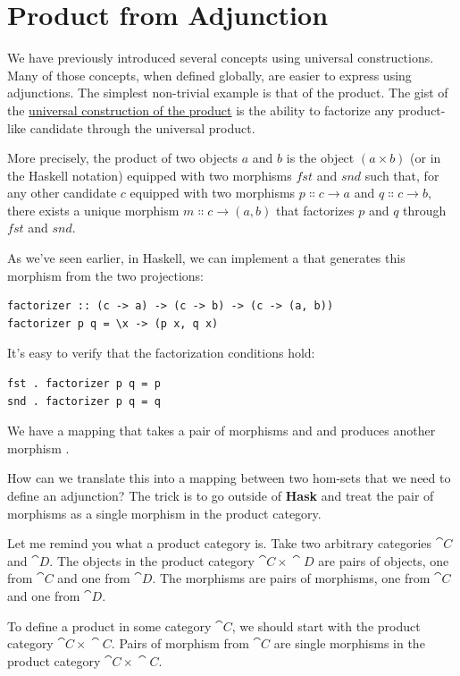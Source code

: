 \section{Product from Adjunction}

We have previously introduced several concepts using universal
constructions. Many of those concepts, when defined globally, are easier
to express using adjunctions. The simplest non-trivial example is that
of the product. The gist of the \hyperref[products-and-coproducts]{universal
construction of the product} is the ability to factorize any
product-like candidate through the universal product.

More precisely, the product of two objects $a$ and $b$ is
the object $(a\times{}b)$ (or  in the Haskell
notation) equipped with two morphisms $fst$ and $snd$ such
that, for any other candidate $c$ equipped with two morphisms
$p \Colon c \to a$ and $q \Colon c \to b$, there
exists a unique morphism $m \Colon c \to (a, b)$ that
factorizes $p$ and $q$ through $fst$ and $snd$.

As we've seen earlier, in Haskell, we can implement a  that generates this
morphism from the two projections:

\begin{Verbatim}
factorizer :: (c -> a) -> (c -> b) -> (c -> (a, b))
factorizer p q = \x -> (p x, q x)
\end{Verbatim}
It's easy to verify that the factorization conditions hold:

\begin{Verbatim}
fst . factorizer p q = p
snd . factorizer p q = q
\end{Verbatim}
We have a mapping that takes a pair of morphisms  and
 and produces another morphism
.

How can we translate this into a mapping between two hom-sets that we
need to define an adjunction? The trick is to go outside of
\textbf{Hask} and treat the pair of morphisms as a single morphism in
the product category.

Let me remind you what a product category is. Take two arbitrary
categories $\cat{C}$ and $\cat{D}$. The objects in the product category
$\cat{C}\times{}\cat{D}$ are pairs of objects, one from $\cat{C}$ and one from
$\cat{D}$. The morphisms are pairs of morphisms, one from $\cat{C}$ and
one from $\cat{D}$.

To define a product in some category $\cat{C}$, we should start with the
product category $\cat{C}\times{}\cat{C}$. Pairs of morphism from $\cat{C}$ are single
morphisms in the product category $\cat{C}\times{}\cat{C}$.

